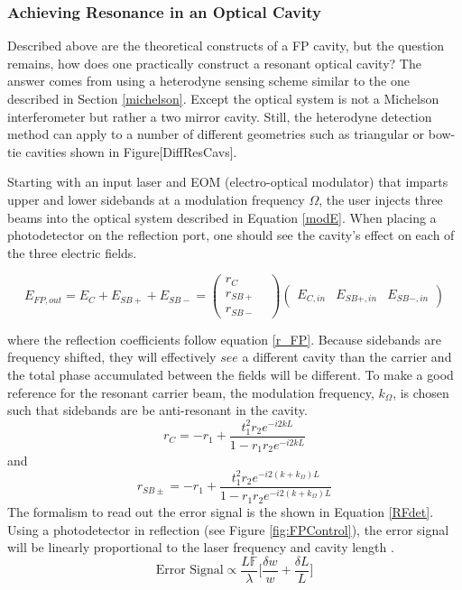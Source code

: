 		\subsubsection{Achieving Resonance in an Optical Cavity}
		Described above are the theoretical constructs of a FP cavity, but the question remains, how does one practically construct a resonant optical cavity?  The answer comes from using a heterodyne sensing scheme similar to the one described in Section \ref{michelson}.  Except the optical system is not a Michelson interferometer but rather a two mirror cavity.  Still, the heterodyne detection method can apply to a number of different geometries such as triangular or bow-tie cavities shown in Figure[DiffResCavs].
		
		Starting with an input laser and EOM (electro-optical modulator) that imparts upper and lower sidebands at a modulation frequency $\Omega$, the user injects three beams into the optical system described in Equation \ref{modE}.  When placing a photodetector on the reflection port, one should see the cavity's effect on each of the three electric fields.
		
		\begin{equation}
		E_{FP,out} = E_{C} + E_{SB+} + E_{SB-} = 
		\begin{pmatrix}
		r_{C} 	&   
		\\ 	r_{SB+} &
		\\ 	r_{SB-} &
		\end{pmatrix}
		\begin{pmatrix}
		E_{C,in} &    E_{SB+,in}    &  E_{SB-,in}     
		\end{pmatrix}
		\end{equation}
		
		where the reflection coefficients follow equation \ref{r_FP}.  Because sidebands are frequency shifted, they will effectively $see$ a different cavity than the carrier and the total phase accumulated between the fields will be different. To make a good reference for the resonant carrier beam, the modulation frequency, $k_{\Omega}$, is chosen such that sidebands are be anti-resonant in the cavity.  
		\begin{equation}
		r_{C} = -r_1 + \frac{t_1^2 r_2  e^{-i2kL}}{1-r_1 r_2 e^{-i2kL}}
		\end{equation}
		and 
		\begin{equation}
		r_{SB\pm} = -r_1 + \frac{t_1^2 r_2  e^{-i2(k+k_{\Omega})L}}{1-r_1 r_2 e^{-i2(k+k_{\Omega})L}}
		\end{equation}
		The formalism to read out the error signal is the shown in Equation \ref{RFdet}. Using a photodetector in reflection (see Figure \ref{fig:FPControl}), the error signal will be linearly proportional to the laser frequency and cavity length \cite{BlackPDH}.
		\begin{equation}
		\text{Error Signal} \propto \frac{L \mathbb{F}}{\lambda} \bigg[\frac{\delta w}{w} + \frac{\delta L}{L}\bigg]
		\end{equation}
		
